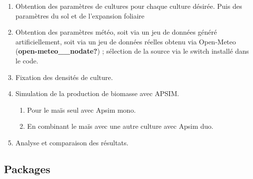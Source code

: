 \documentclass[
]{article}
\begin{document}
\begin{enumerate}
\def\labelenumi{\arabic{enumi}.}
\item
  Obtention des paramètres de cultures pour chaque culture désirée. Puis
  des paramètres du sol et de l'expansion foliaire
\item
  Obtention des paramètres météo, soit via un jeu de données généré
  artificiellement, soit via un jeu de données réelles obtenu via
  Open-Meteo (\textbf{open-meteo\_\_nodate?}) ; sélection de la source
  via le switch installé dans le code.
\item
  Fixation des densités de culture.
\item
  Simulation de la production de biomasse avec APSIM.

  \begin{enumerate}
  \def\labelenumii{\arabic{enumii}.}
  \item
    Pour le maïs seul avec Apsim mono.
  \item
    En combinant le maïs avec une autre culture avec Apsim duo.
  \end{enumerate}
\item
  Analyse et comparaison des résultats.
\end{enumerate}

\subsection{Packages}\label{packages}
\end{document}
